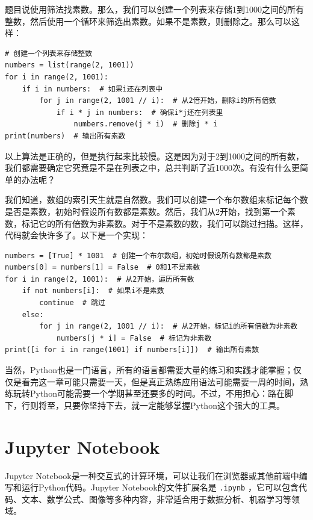 \begin{answer}
  题目说使用筛法找素数。那么，我们可以创建一个列表来存储1到1000之间的所有整数，然后使用一个循环来筛选出素数。如果不是素数，则删除之。那么可以这样：

\begin{verbatim}
# 创建一个列表来存储整数
numbers = list(range(2, 1001))
for i in range(2, 1001):
    if i in numbers:  # 如果i还在列表中
        for j in range(2, 1001 // i):  # 从2倍开始，删除i的所有倍数
            if i * j in numbers:  # 确保i*j还在列表里
                numbers.remove(j * i)  # 删除j * i
print(numbers)  # 输出所有素数
\end{verbatim}

  以上算法是正确的，但是执行起来比较慢。这是因为对于2到1000之间的所有数，我们都需要确定它究竟是不是在列表之中，总共判断了近1000次。有没有什么更简单的办法呢？

  我们知道，数组的索引天生就是自然数。我们可以创建一个布尔数组来标记每个数是否是素数，初始时假设所有数都是素数。然后，我们从2开始，找到第一个素数，标记它的所有倍数为非素数。对于不是素数的数，我们可以跳过扫描。这样，代码就会快许多了。以下是一个实现：

\begin{verbatim}
numbers = [True] * 1001  # 创建一个布尔数组，初始时假设所有数都是素数
numbers[0] = numbers[1] = False  # 0和1不是素数
for i in range(2, 1001):  # 从2开始，遍历所有数
    if not numbers[i]:  # 如果i不是素数
        continue  # 跳过
    else:
        for j in range(2, 1001 // i):  # 从2开始，标记i的所有倍数为非素数
            numbers[j * i] = False  # 标记为非素数
print([i for i in range(1001) if numbers[i]])  # 输出所有素数
\end{verbatim}
\end{answer}

当然，Python也是一门语言，所有的语言都需要大量的练习和实践才能掌握；仅仅是看完这一章可能只需要一天，但是真正熟练应用语法可能需要一周的时间，熟练玩转Python可能需要一个学期甚至还要多的时间。不过，不用担心：路在脚下，行则将至，只要你坚持下去，就一定能够掌握Python这个强大的工具。

\section{Jupyter Notebook}

Jupyter Notebook是一种交互式的计算环境，可以让我们在浏览器或其他前端中编写和运行Python代码。Jupyter Notebook的文件扩展名是 \texttt{.ipynb} ，它可以包含代码、文本、数学公式、图像等多种内容，非常适合用于数据分析、机器学习等领域。

